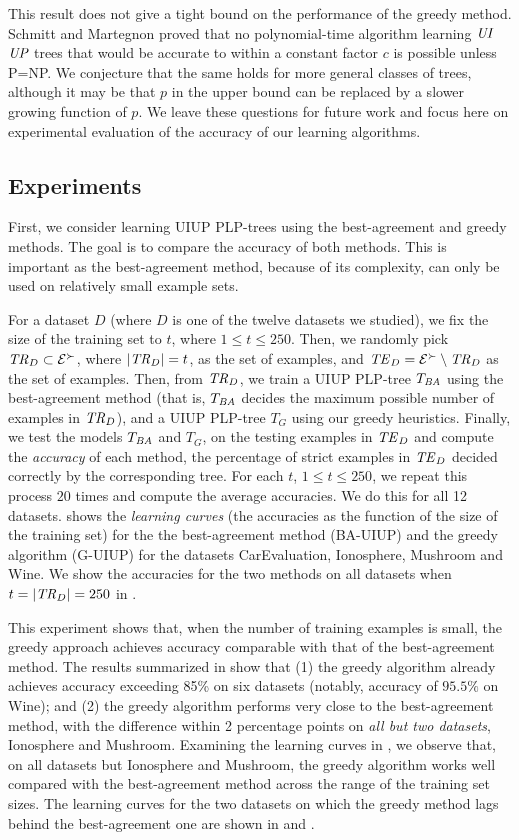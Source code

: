 This result does not give a tight bound on the performance of the greedy 
method. Schmitt and Martegnon \cite{schmitt2006complexity} proved that no
polynomial-time algorithm learning $\textit{UI}$$\textit{UP}$ trees that would be accurate 
to within a constant factor $c$ is possible unless P=NP. We conjecture that
the same holds for more general classes of trees, although it may be that
$p$ in the upper bound can be replaced by a slower growing function of $p$.   
We leave these questions for future work and focus here on experimental
evaluation of the accuracy of our learning algorithms.


\subsection{Experiments}
\label{sec:exp_trees}
First, we consider learning UIUP PLP-trees using the 
best-agreement and greedy methods. The goal is to compare the accuracy of
both methods. This is important as the best-agreement method, because of 
its complexity, can only be used on relatively small example sets. 

For a dataset $D$ (where $D$ is one of the twelve datasets we studied),
we fix the size of the training set to $t$, where $1\leq t\leq 250$. 
Then, we randomly pick $\mathit{TR}_D \subset \mathcal{E}^\succ$, where $|\mathit{TR}_D|=t$, 
as the set of 
 examples, and $\mathit{TE}_D = \mathcal{E}^\succ \setminus \mathit{TR}_D$ as the set 
of  examples. Then, from $\mathit{TR}_D$, we train a UIUP PLP-tree 
$T_{\textit{BA}}$ using the best-agreement method (that is, $T_{\textit{BA}}$ decides the maximum
possible number of examples in $\mathit{TR}_D$), and a UIUP PLP-tree $T_G$ using 
our greedy heuristics. Finally, we test the models $T_{\textit{BA}}$ and $T_G$, on the testing examples in 
$\mathit{TE}_D$ and compute the \emph{accuracy} of each method, the percentage of 
strict examples in $\mathit{TE}_D$ decided correctly by the corresponding tree. 
For each $t$, $1\leq t\leq 250$, we repeat this process $20$ times and 
compute the average accuracies. We do this for all 12 datasets. 
 shows the \emph{learning curves} (the accuracies as the function of the
size of the training set) for the the best-agreement method (BA-UIUP)
and the greedy algorithm (G-UIUP)
for the datasets CarEvaluation, Ionosphere, Mushroom and Wine. 
We show the accuracies for the two methods on all datasets when 
$t=|\mathit{TR}_D|=250$ in .

This experiment shows that, when the number of training examples 
is small, the greedy approach achieves accuracy comparable with that of
the best-agreement method. The results summarized in  show 
that (1) the greedy algorithm already achieves accuracy exceeding 85\%
on six datasets (notably, accuracy of $95.5\%$ on Wine); and (2) the 
greedy algorithm performs very close to the best-agreement method, with the
difference within 2 percentage points on \emph{all but two datasets}, Ionosphere and 
Mushroom. Examining the learning curves in , we observe 
that, on all datasets but Ionosphere and Mushroom,
the greedy algorithm works well compared with the best-agreement method
across the range of the training set sizes. 
The learning curves for the two 
datasets on which the greedy method lags behind the best-agreement one are 
shown in  and .

